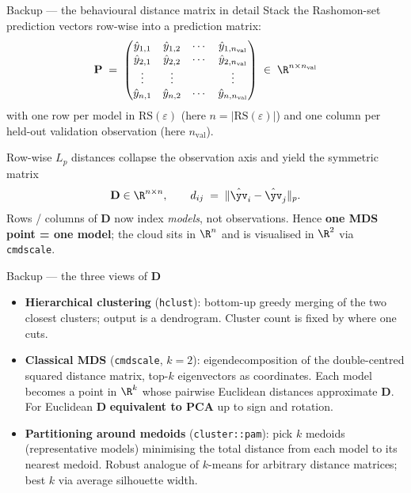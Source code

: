\documentclass[aspectratio=169]{beamer}
\newcommand{\Rset}{\mathrm{RS}(\varepsilon)}
\begin{document}
\begin{frame}{Backup --- the behavioural distance matrix in detail}
  Stack the Rashomon-set prediction vectors row-wise into a prediction matrix:
  \[
    \mathbf{P} \;=\;
    \begin{pmatrix}
      \hat y_{1,1} & \hat y_{1,2} & \cdots & \hat y_{1,n_{\text{val}}} \\
      \hat y_{2,1} & \hat y_{2,2} & \cdots & \hat y_{2,n_{\text{val}}} \\
      \vdots       & \vdots       &        & \vdots                    \\
      \hat y_{n,1} & \hat y_{n,2} & \cdots & \hat y_{n,n_{\text{val}}}
    \end{pmatrix}
    \;\in\; \R^{n \times n_{\text{val}}}
  \]
  with one row per model in $\Rset$ (here $n = |\Rset|$) and one column per held-out validation observation (here $n_{\text{val}}$).

  \vspace{0.5ex}
  Row-wise $L_p$ distances collapse the observation axis and yield the symmetric matrix
  \[
    \mathbf{D} \in \R^{n \times n}, \qquad d_{ij} \;=\; \|\hat{\yv}_i - \hat{\yv}_j\|_p.
  \]
  {\footnotesize Rows / columns of $\mathbf{D}$ now index \emph{models}, not observations. Hence \textbf{one MDS point = one model}; the cloud sits in $\R^n$ and is visualised in $\R^2$ via \texttt{cmdscale}.}
\end{frame}

\begin{frame}{Backup --- the three views of $\mathbf{D}$}
  \begin{itemize}
    \item \textbf{Hierarchical clustering} (\texttt{hclust}): bottom-up greedy merging of the two closest clusters; output is a dendrogram. Cluster count is fixed by where one cuts.
    \item \textbf{Classical MDS} (\texttt{cmdscale}, $k = 2$): eigendecomposition of the double-centred squared distance matrix, top-$k$ eigenvectors as coordinates. Each model becomes a point in $\R^k$ whose pairwise Euclidean distances approximate $\mathbf{D}$. For Euclidean $\mathbf{D}$ \textbf{equivalent to PCA} up to sign and rotation.
    \item \textbf{Partitioning around medoids} (\texttt{cluster::pam}): pick $k$ medoids (representative models) minimising the total distance from each model to its nearest medoid. Robust analogue of $k$-means for arbitrary distance matrices; best $k$ via average silhouette width.
  \end{itemize}
\end{frame}
\end{document}
